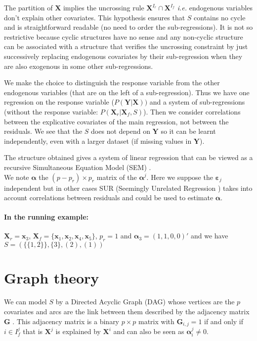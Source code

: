 \documentclass[12pt,a4paper]{report}
\begin{document}
The partition of $\boldsymbol{X}$ implies the uncrossing rule  $\boldsymbol{X}^{I_r} \cap \boldsymbol{X}^{I_f}$ 
{\it i.e.} endogenous variables don't explain other covariates. This hypothesis ensures that $S$ contains no cycle and is straightforward readable (no need to order the sub-regressions). It is not so restrictive because cyclic structures have no sense and any non-cyclic structure can be associated with a structure that verifies the uncrossing constraint by just successively replacing endogenous covariates by their sub-regression when they are also exogenous in some other sub-regressions.

	
	  We make the choice to distinguish the response variable from the other endogenous variables (that are on the left of a sub-regression). Thus we have one regression on the response variable ($P(\boldsymbol{Y}|\boldsymbol{X}))$ and a system of sub-regressions (without the response variable: $P(\boldsymbol{X}_r|\boldsymbol{X}_f,S)$). Then we consider correlations between the explicative covariates of the main regression, not between the residuals. We see that the $S$ does not depend on $\boldsymbol{Y}$ so it can be learnt independently, even with a larger dataset (if missing values in $\boldsymbol{Y}$).
	 
The structure obtained gives a system of linear regression that can be viewed as a recursive Simultaneous Equation Model (\textsc{SEM})\cite{davidson1993estimation} \cite{TIMM}.
\\
We note $\boldsymbol{\alpha}$ the $(p-p_r)\times p_r$ matrix of the  $\boldsymbol{\alpha}^j$.
  	Here we suppose the $\boldsymbol{\varepsilon}_j$ independent but in other cases \textsc{SUR} (Seemingly Unrelated Regression \cite{SURzellner}) takes into account correlations between residuals and could be used to estimate $\boldsymbol{\alpha}$. 
		 
	 
\paragraph{In the running example:}$\boldsymbol{X}_r=\boldsymbol{x}_3$, $\boldsymbol{X}_f=\{\boldsymbol{x}_1,\boldsymbol{x}_2,\boldsymbol{x}_4,\boldsymbol{x}_5 \}$, $p_r=1$ and $\boldsymbol{\alpha}_3=(1,1,0,0)'$ and we have $S= \left( \{ \{1,2\}\},\{3\},(2),(1)\right)$


\section{Graph theory}\label{sectiongraph}
	We can model $S$ by a Directed Acyclic Graph (DAG) whose vertices are the $p$ covariates and arcs are the link between them described by the adjacency matrix $\boldsymbol{G}$ \cite{bondy1976graph}. This adjacency matrix is a binary $p\times p$ matrix with $\boldsymbol{G}_{i,j}=1$ if and only if $i \in I_f^j$ that is $\boldsymbol{X}^j$ is explained by $\boldsymbol{X}^i$ and can also be seen as $\boldsymbol{\alpha}_i^j\neq 0$.
	
\end{document}
